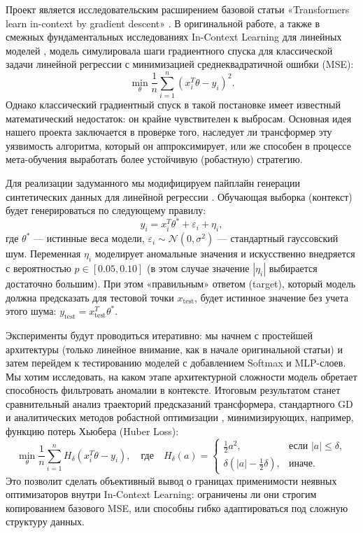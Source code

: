 \documentclass[12pt,a4paper]{article}
\begin{document}
	Проект является исследовательским расширением базовой статьи «Transformers learn in-context by gradient descent» \cite{vonOswald2023}. В оригинальной работе, а также в смежных фундаментальных исследованиях In-Context Learning для линейных моделей \cite{garg2022what, akyurek2022what}, модель симулировала шаги градиентного спуска для классической задачи линейной регрессии с минимизацией среднеквадратичной ошибки (MSE):
	$$ \min_{\theta} \frac{1}{n} \sum_{i=1}^n (x_i^T \theta - y_i)^2. $$
	Однако классический градиентный спуск в такой постановке имеет известный математический недостаток: он крайне чувствителен к выбросам. Основная идея нашего проекта заключается в проверке того, наследует ли трансформер эту уязвимость алгоритма, который он аппроксимирует, или же способен в процессе мета-обучения выработать более устойчивую (робастную) стратегию.
	
	Для реализации задуманного мы модифицируем пайплайн генерации синтетических данных для линейной регрессии \cite{garg2022what}. Обучающая выборка (контекст) будет генерироваться по следующему правилу:
	$$ y_i = x_i^T \theta^* + \varepsilon_i + \eta_i, $$
	где $\theta^*$ --- истинные веса модели, $\varepsilon_i \sim \mathcal{N}(0, \sigma^2)$ --- стандартный гауссовский шум. Переменная $\eta_i$ моделирует аномальные значения и искусственно внедряется с вероятностью $p \in [0.05, 0.10]$ (в этом случае значение $|\eta_i|$ выбирается достаточно большим). При этом «правильным» ответом (target), который модель должна предсказать для тестовой точки $x_{\text{test}}$, будет истинное значение без учета этого шума: $y_{\text{test}} = x_{\text{test}}^T \theta^*$.
	
	Эксперименты будут проводиться итеративно: мы начнем с простейшей архитектуры (только линейное внимание, как в начале оригинальной статьи) и затем перейдем к тестированию моделей с добавлением Softmax и MLP-слоев. Мы хотим исследовать, на каком этапе архитектурной сложности модель обретает способность фильтровать аномалии в контексте. Итоговым результатом станет сравнительный анализ траекторий предсказаний трансформера, стандартного GD и аналитических методов робастной оптимизации \cite{huber1964robust}, минимизирующих, например, функцию потерь Хьюбера (Huber Loss):
$$ \min_{\theta} \frac{1}{n} \sum_{i=1}^n H_\delta(x_i^T \theta - y_i), \quad \text{где} \quad H_\delta(a) = \begin{cases} \frac{1}{2}a^2, & \text{если } |a| \le \delta, \\ \delta(|a| - \frac{1}{2}\delta), & \text{иначе.} \end{cases} $$
Это позволит сделать объективный вывод о границах применимости неявных оптимизаторов внутри In-Context Learning: ограничены ли они строгим копированием базового MSE, или способны гибко адаптироваться под сложную структуру данных.
\end{document}
